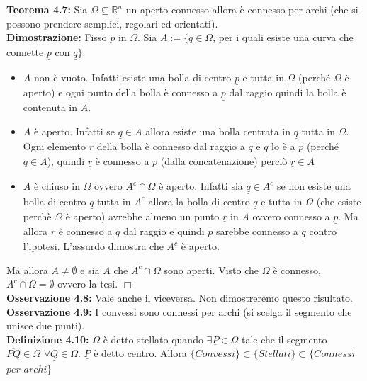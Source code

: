 \documentclass[a4paper,11pt,titlepage]{book}
\begin{document}
\textbf{Teorema 4.7: }Sia $\Omega\subseteq\mathbb{R}^n$ un aperto connesso allora è connesso per archi (che si possono prendere semplici, regolari ed orientati).\\

\textbf{Dimostrazione: }Fisso $\underline p$ in $\Omega$. Sia $A:=\{\underline q\in\Omega$, per i quali esiste una curva che connette $\underline p$ con $\underline q\}$:\begin{itemize}
\item $A$ non è vuoto. Infatti esiste una bolla di centro $\underline p$ e tutta in $\Omega$ (perché $\Omega$ è aperto) e ogni punto della bolla è connesso a $\underline p$ dal raggio quindi la bolla è contenuta in $A$.
\item $A$ è aperto. Infatti se $\underline q\in A$ allora esiste una bolla centrata in $\underline q$ tutta in $\Omega$. Ogni elemento $\underline r$ della bolla è connesso dal raggio a $\underline q$ e $\underline q$ lo è a $\underline p$ (perché $\underline q\in A$), quindi $\underline r$ è connesso a $\underline p$ (dalla concatenazione) perciò $\underline r\in A$
\item $A$ è chiuso in $\Omega$ ovvero $A^c \cap \Omega$ è aperto. Infatti sia $\underline q \in A^c$ se non esiste una bolla di centro $\underline q$ tutta in $A^c$ allora la bolla di centro $\underline q$ e tutta in $\Omega$ (che esiste perchè $\Omega$ è aperto) avrebbe almeno un punto $\underline r$ in $A$ ovvero connesso a $\underline p$. Ma allora $\underline r$ è connesso a $\underline q$ dal raggio e quindi $\underline p$ sarebbe connesso a $\underline q$ contro l'ipotesi. L'assurdo dimostra che $A^c$ è aperto.
\end{itemize}
Ma allora $A\ne\emptyset$ e sia $A$ che $A^c\cap\Omega$ sono aperti. Visto che $\Omega$ è connesso, $A^c\cap\Omega=\emptyset$ ovvero la tesi. $\Box$\\

\textbf{Osservazione 4.8:} Vale anche il viceversa. Non dimostreremo questo risultato.\\

\textbf{Osservazione 4.9:} I convessi sono connessi per archi (si scelga il segmento che unisce due punti).\\

\textbf{Definizione 4.10:} $\Omega$ è detto stellato quando $\exists \underline P\in\Omega$ tale che il segmento $\overline{PQ}\in\Omega$ $\forall\underline{Q}\in\Omega$. $\underline P$ è detto centro. Allora $\{Convessi\}\subset\{Stellati\}\subset\{Connessi$ $per$ $archi\}$\\
\end{document}
